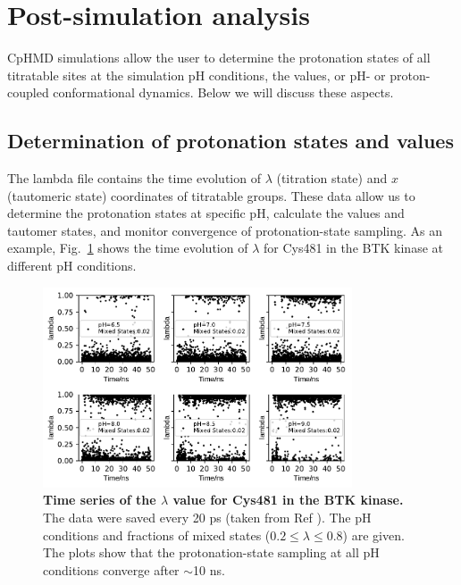 \section{Post-simulation analysis}
CpHMD simulations allow the user to determine
the protonation states of all titratable sites
at the simulation pH conditions, 
the {\pka} values, 
or pH- or proton-coupled conformational dynamics. 
Below we will discuss these aspects. 

\subsection{Determination of protonation states and {\pka} values}
The lambda file contains the time evolution of $\lambda$ (titration state) 
and $x$ (tautomeric state) coordinates of titratable groups.
These data allow us to determine the protonation
states at specific pH, calculate the
{\pka} values and tautomer states, and 
monitor convergence of protonation-state sampling.
As an example, Fig.~\ref{Fig:lambda_time} shows the time evolution 
of $\lambda$ for Cys481 in the BTK kinase
at different pH conditions.

\begin{figure}[htb!]
    \centering
    \includegraphics[width=3.6in]{figs/btk_c481_lambdavstime.pdf}
    \caption{\textbf{Time series of the $\lambda$ value for Cys481 in the BTK kinase.} 
    The data were saved every 20 ps (taken from Ref \cite{Liu_Shen_2021_J.Med.Chem.}). 
    The pH conditions and fractions of mixed states ($0.2 \le \lambda \le 0.8$) are given. 
    The plots show that the protonation-state sampling at all pH conditions 
    converge after $\sim$10 ns.
    }
\label{Fig:lambda_time}
\end{figure}
 
